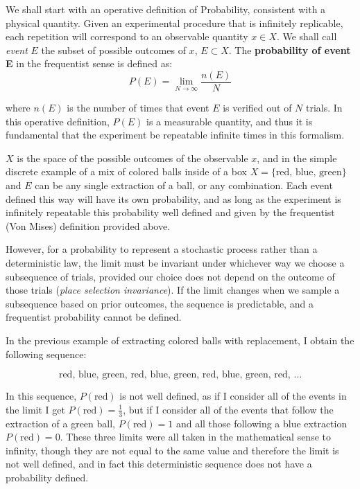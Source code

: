 We shall start with an operative definition of Probability, consistent with a physical quantity. Given an experimental procedure that is infinitely replicable, each repetition will correspond to an observable quantity $x\in X$. We shall call \emph{event} $E$ the subset of possible outcomes of $x$, $E\subset X$. The \textbf{probability of event E} in the frequentist sense is defined as:
	\[
	P(E) = \lim_{N\to\infty} \frac{n(E)}{N}
	\]

where $n(E)$ is the number of times that event $E$ is verified out of $N$ trials. In this operative definition, $P(E)$ is a measurable quantity, and thus it is fundamental that the experiment be repeatable infinite times in this formalism.

$X$ is the space of the possible outcomes of the observable $x$, and in the simple discrete example of a mix of colored balls inside of a box $X=\{ \text{red, blue, green}\}$ and $E$ can be any single extraction of a ball, or any combination. Each event defined this way will have its own probability, and as long as the experiment is infinitely repeatable this probability well defined and given by the frequentist (Von Mises) definition provided above. 

However, for a probability to represent a stochastic process rather than a deterministic law, the limit must be invariant under whichever way we choose a subsequence of trials, provided our choice does not depend on the outcome of those trials (\emph{place selection invariance}). If the limit changes when we sample a subsequence based on prior outcomes, the sequence is predictable, and a frequentist probability cannot be defined.

\begin{example}
	In the previous example of extracting colored balls with replacement, I obtain the following sequence:
	
	\[
	\text{red, blue, green, red, blue, green, red, blue, green, red, }\dots
	\]
	
	In this sequence, $P(\text{red})$ is not well defined, as if I consider all of the events in the limit I get $P(\text{red})=\frac{1}{3}$, but if I consider all of the events that follow the extraction of a green ball, $P(\text{red})=1$ and all those following a blue extraction $P(\text{red})=0$. These three limits were all taken in the mathematical sense to infinity, though they are not equal to the same value and therefore the limit is not well defined, and in fact this deterministic sequence does not have a probability defined. 
\end{example}

